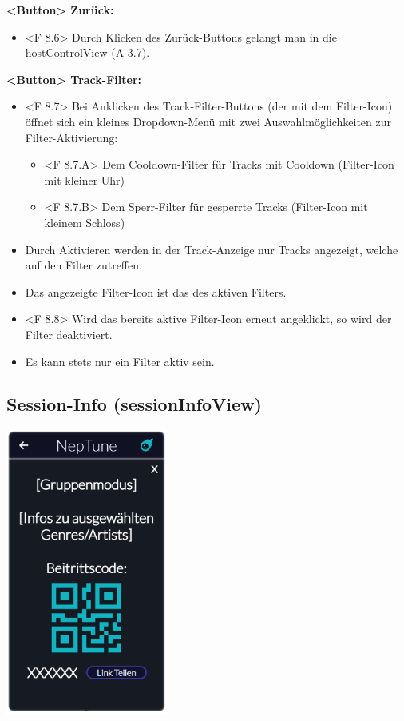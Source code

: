 \documentclass[oneside, ngerman]{sdqtechreport}
\begin{document}
\textbf{<Button> Zurück:}
\begin{itemize}
    \hypertarget{<F 8.6>}{}
    \item <F 8.6> Durch Klicken des Zurück-Buttons gelangt man in die  \hyperlink{hostControlView}{hostControlView (A 3.7)}.
\end{itemize}

\textbf{<Button> Track-Filter:}
\begin{itemize}
    \hypertarget{<F 8.7>}{}
    \item <F 8.7> Bei Anklicken des Track-Filter-Buttons (der mit dem Filter-Icon) öffnet sich ein kleines Dropdown-Menü mit zwei Auswahlmöglichkeiten zur Filter-Aktivierung:
    \begin{itemize}
        \hypertarget{<F 8.7.A>}{}
        \item <F 8.7.A> Dem Cooldown-Filter für Tracks mit Cooldown (Filter-Icon mit kleiner Uhr)
        \hypertarget{<F 8.7.B>}{}
        \item <F 8.7.B> Dem Sperr-Filter für gesperrte Tracks (Filter-Icon mit kleinem Schloss)
    \end{itemize}
    \item Durch Aktivieren werden in der Track-Anzeige nur Tracks angezeigt, welche auf den Filter zutreffen.
    \item Das angezeigte Filter-Icon ist das des aktiven Filters.
    \hypertarget{<F 8.8>}{}
    \item <F 8.8> Wird das bereits aktive Filter-Icon erneut angeklickt, so wird der Filter deaktiviert.
    \item Es kann stets nur ein Filter aktiv sein.
\end{itemize}


\subsection{Session-Info (sessionInfoView)}
\label{sec:Benutzeroberfläche:sessionInfoView}

\begin{center}
    \hypertarget{sessionInfoView}{}
    \includegraphics[width=0.4\textwidth]{LATEX/Pflichtenheft/GraphicDesigns/shareLinkPopUpPage.png}
\end{center}
\end{document}
